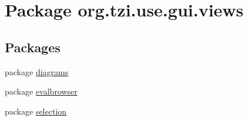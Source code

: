 \hypertarget{namespaceorg_1_1tzi_1_1use_1_1gui_1_1views}{\section{Package org.\-tzi.\-use.\-gui.\-views}
\label{namespaceorg_1_1tzi_1_1use_1_1gui_1_1views}
}
\subsection*{Packages}
\begin{DoxyCompactItemize}
\item 
package \hyperlink{namespaceorg_1_1tzi_1_1use_1_1gui_1_1views_1_1diagrams}{diagrams}
\item 
package \hyperlink{namespaceorg_1_1tzi_1_1use_1_1gui_1_1views_1_1evalbrowser}{evalbrowser}
\item 
package \hyperlink{namespaceorg_1_1tzi_1_1use_1_1gui_1_1views_1_1selection}{selection}
\end{DoxyCompactItemize}
